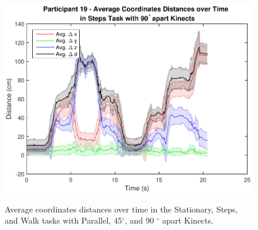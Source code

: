 \begin{figure}[!h]
{    \includegraphics[width=0.33\linewidth]{figs/Participant_19_Task_Steps_Kinect_90_coordinates_over_time}
  } \\

  \caption{Average coordinates distances over time in the Stationary, Steps, and Walk tasks with Parallel, 45$^{\circ}$, and 90 $^{\circ}$ apart Kinects.}

  \label{fig:results_three_coordinates_over_time}
\end{figure}

